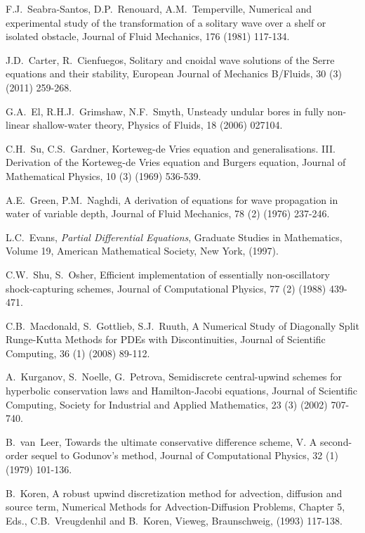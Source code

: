 \documentclass[preprint,sort&compress,1p]{article}
\begin{document}
\begin{thebibliography}{99}
 F.J.~Seabra-Santos, D.P.~Renouard, A.M.~Temperville, Numerical and experimental study of the transformation of a solitary wave over a shelf or isolated obstacle, Journal of Fluid Mechanics, 176 (1981) 117-134.

 J.D.~Carter, R.~Cienfuegos, Solitary and cnoidal wave solutions of the Serre equations and their stability, European Journal of Mechanics B/Fluids, 30 (3) (2011) 259-268.

 G.A.~El, R.H.J.~Grimshaw, N.F.~Smyth, Unsteady undular bores in fully non-linear shallow-water theory, Physics of Fluids, 18 (2006) 027104.

 C.H.~Su, C.S.~Gardner, Korteweg-de Vries equation and generalisations. III. Derivation of the Korteweg-de Vries equation and Burgers equation, Journal of Mathematical Physics, 10 (3) (1969) 536-539.

 A.E.~Green, P.M.~Naghdi, A derivation of equations for wave propagation in water of variable depth, Journal of Fluid Mechanics, 78 (2) (1976) 237-246.

 L.C.~Evans, \emph{Partial Differential Equations}, Graduate Studies in Mathematics, Volume 19, American Mathematical Society, New York, (1997).

 C.W.~Shu, S.~Osher, Efficient implementation of essentially non-oscillatory shock-capturing schemes, Journal of Computational Physics,  77 (2) (1988) 439-471.

 C.B.~Macdonald, S.~Gottlieb, S.J.~Ruuth, A Numerical Study of Diagonally Split Runge-Kutta Methods for PDEs with Discontinuities, Journal of Scientific Computing, 36 (1) (2008) 89-112.

 A.~Kurganov, S.~Noelle, G.~Petrova, Semidiscrete central-upwind schemes for hyperbolic conservation laws and Hamilton-Jacobi equations, Journal of Scientific Computing, Society for Industrial and Applied Mathematics, 23 (3) (2002) 707-740.

 B.~van~Leer, Towards the ultimate conservative difference scheme, V. A second-order sequel to Godunov's method, Journal of Computational Physics, 32 (1) (1979) 101-136.

 B.~Koren, A robust upwind discretization method for advection, diffusion and source term, Numerical Methods for Advection-Diffusion Problems, Chapter 5, Eds., C.B.~Vreugdenhil and B.~Koren, Vieweg, Braunschweig, (1993) 117-138.


\end{thebibliography}
\end{document}

